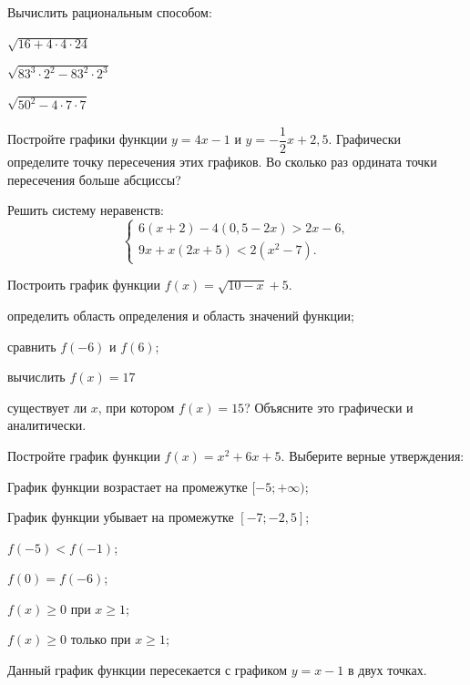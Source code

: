 %
%
\begin{homework}[number=1]
	\begin{listofex}
		\item Вычислить рациональным способом:
		\begin{enumcols}[itemcolumns=3]
			\item \( \sqrt{16+4\cdot4\cdot24} \)
			\item \( \sqrt{83^3\cdot2^2-83^2\cdot2^3} \)
			\item \( \sqrt{50^2-4\cdot7\cdot7} \)
		\end{enumcols}
		\item Постройте графики функции \( y=4x-1 \) и \( y=-\dfrac{1}{2}x+2,5 \). Графически определите точку пересечения этих графиков. Во сколько раз ордината точки пересечения больше абсциссы?
		\item Решить систему неравенств:
		\[ \left\{
		\begin{array}{l}
			6(x+2)-4(0,5-2x)>2x-6,\\
			9x+x(2x+5)<2(x^2-7).
		\end{array}
		\right. \]
		\item {}
		\item {}
		\item Построить график функции \( f(x)=\sqrt{10-x}+5 \).
		\begin{enumcols}[itemcolumns=1]
			\item определить область определения и область значений функции;
			\item сравнить \( f(-6) \) и \( f(6) \);
			\item вычислить \( f(x)=17 \)
			\item существует ли \( x \), при котором \( f(x)=15 \)? Объясните это графически и аналитически.
		\end{enumcols}
		\item Постройте график функции \( f(x)=x^2+6x+5 \). Выберите верные утверждения:
		\begin{enumcols}[itemcolumns=1]
			\item График функции возрастает на промежутке \( [-5;+\infty) \);
			\item График функции убывает на промежутке \( [-7;-2,5] \);
			\item \( f(-5)<f(-1) \);
			\item \( f(0)=f(-6) \);
			\item \( f(x)\ge0 \) при \( x\ge1 \);
			\item \( f(x)\ge0 \) только при \( x\ge1 \);
			\item Данный график функции пересекается с графиком \( y=x-1 \) в двух точках.
		\end{enumcols}
	\end{listofex}
\end{homework}
